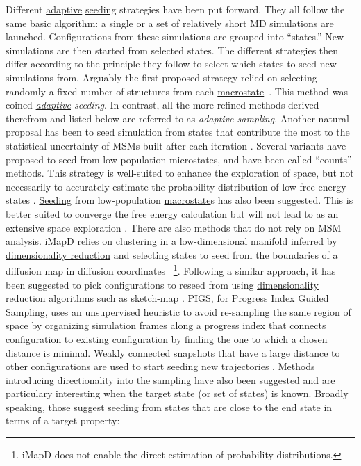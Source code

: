 \documentclass[9pt,review]{livecoms}
\begin{document}
Different \hyperlink{ref:Adaptive} {adaptive} \hyperlink{ref:Seeding} {seeding} strategies have been put forward. They all follow the same basic algorithm: a single or a set of relatively short MD simulations are launched. Configurations from these simulations are grouped into ``states.'' New simulations are then started from selected states. The different strategies then differ according to the principle they follow to select which states to seed new simulations from.
Arguably the first proposed strategy relied on selecting randomly a fixed number of structures from each \hyperlink{ref:Macrostate} {macrostate}~\cite{doi:10.1063/1.2740261,Huang19765,doi:10.1021/ct900620b}. This method was coined \emph{\hyperlink{ref:Adaptive} {adaptive} seeding}. In contrast, all the more refined methods derived therefrom and listed below are referred to as \emph{adaptive sampling}. Another natural proposal has been to seed simulation from states that contribute the most to the statistical uncertainty of MSMs built after each iteration \cite{doi:10.1021/ct500827g}. Several variants have proposed to seed from low-population microstates, and have been called ``counts'' methods. This strategy is well-suited to enhance the exploration of space, but not necessarily to accurately estimate the probability distribution of low free energy states \cite{doi:10.1021/ct2004484,doi:10.1021/ct400919u,lecina_adaptive_2017,shamsi_enhanced_2017,6114444}. \hyperlink{ref:Seeding} {Seeding} from low-population \hyperlink{ref:Macrostate} {macrostate}s has also been suggested. This is better suited to converge the free energy calculation but will not lead to as an extensive space exploration \cite{doi:10.1021/acs.jctc.6b00762,doi:10.1063/1.5053582}. There are also methods that do not rely on MSM analysis. iMapD relies on clustering in a low-dimensional manifold inferred by \hyperlink{ref:DimRed} {dimensionality reduction} and selecting states to seed from the boundaries of a diffusion map in diffusion coordinates \cite{ChiavazzoE5494}~\footnote{iMapD does not enable the direct estimation of probability distributions.}. Following a similar approach, it has been suggested to pick configurations to reseed from using \hyperlink{ref:DimRed} {dimensionality reduction} algorithms such as sketch-map \cite{doi:10.1021/acs.jctc.6b00503}. PIGS, for Progress Index Guided Sampling, uses an unsupervised heuristic to avoid re-sampling the same region of space by organizing simulation frames along a progress index that connects configuration to existing configuration by finding the one to which a chosen distance is minimal. Weakly connected snapshots that have a large distance to other configurations are used to start \hyperlink{ref:Seeding} {seeding} new trajectories \cite{BACCI2015889}. Methods introducing directionality into the sampling have also been suggested and are particulary interesting when the target state (or set of states) is known. Broadly speaking, those suggest \hyperlink{ref:Seeding} {seeding} from states that are close to the end state in terms of a target property:
\end{document}
